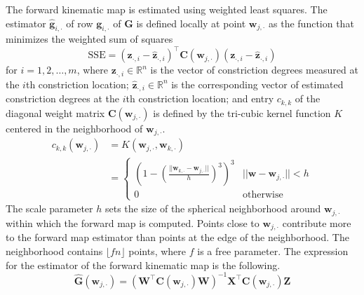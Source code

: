 \documentclass[preprint]{JASAnew}
\begin{document}
%
The forward kinematic map is estimated using weighted least squares. 
% 
The estimator $\mathbf{\hat{g}}_{i,\cdot}$ of row $\mathbf{g}_{i,\cdot}$ of $\mathbf{G}$ is defined locally at point $\mathbf{w}_{j,\cdot}$ as the function that minimizes the weighted sum of squares
%
\begin{equation}
\mathrm{SSE} 
=
\left( \mathbf{z}_{\cdot,i} - \mathbf{\hat{z}}_{\cdot,i} \right)^\intercal
\mathbf{C}(\mathbf{w}_{j,\cdot})
\left( \mathbf{z}_{\cdot,i} - \mathbf{\hat{z}}_{\cdot,i} \right)
\end{equation}
%
for $i=1,2,\ldots,m$,
% 
where $\mathbf{z}_{\cdot,i} \in \mathbb{R}^{n}$ is the vector of constriction degrees measured at the $i$th constriction location; 
%
$\mathbf{\hat{z}}_{\cdot,i} \in \mathbb{R}^{n}$ is the corresponding vector of estimated constriction degrees at the $i$th constriction location; and 
%
entry $c_{k,k}$ of the diagonal weight matrix $\mathbf{C}(\mathbf{w}_{j,\cdot})$ is defined by the tri-cubic kernel function $K$ centered in the neighborhood of $\mathbf{w}_{j,\cdot}$.
%
\begin{align}\label{eq:gaussiankernel}
c_{k,k} (\mathbf{w}_{j,\cdot})
&=
K(\mathbf{w}_{j,\cdot},\mathbf{w}_{k,\cdot}) \\
&= 
\begin{cases}
\left( 1 - \left( \frac{\lvert\lvert \mathbf{w}_{k,\cdot} - \mathbf{w}_{j,\cdot} \rvert\rvert}{h} \right)^3 \right)^3 & \lvert\lvert \mathbf{w} - \mathbf{w}_{j,\cdot} \rvert\rvert < h \\
0 & \text{otherwise}
\end{cases} 
\end{align}
%
The scale parameter $h$ sets the size of the spherical neighborhood around $\mathbf{w}_{j,\cdot}$ within which the forward map is computed. 
%
Points close to $\mathbf{w}_{j,\cdot}$ contribute more to the forward map estimator than points at the edge of the neighborhood.
%
The neighborhood contains $\lfloor fn \rfloor$ points, where $f$ is a free parameter. 
%
The expression for the estimator of the forward kinematic map is the following. 
\begin{equation}
\mathbf{\hat{G}} (\mathbf{w}_{j,\cdot})
=
\left( \mathbf{W}^\intercal \mathbf{C}(\mathbf{w}_{j,\cdot}) \mathbf{W} \right)^{-1} \mathbf{X}^\intercal \mathbf{C}(\mathbf{w}_{j,\cdot}) \mathbf{Z}
\end{equation}
\end{document}
